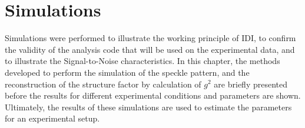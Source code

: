 \chapter{Simulations}
\label{chap:simulation}


Simulations were performed to illustrate the working principle of IDI, to confirm the validity of the analysis code that will be used on the experimental data, and to illustrate the Signal-to-Noise characteristics. 
In this chapter, the methods developed to perform the simulation of the speckle pattern, and the reconstruction of the structure factor by calculation of $g^2$ are briefly presented before the results for different experimental conditions and parameters are shown. Ultimately, the results of these simulations are used to estimate the parameters for an experimental setup.


